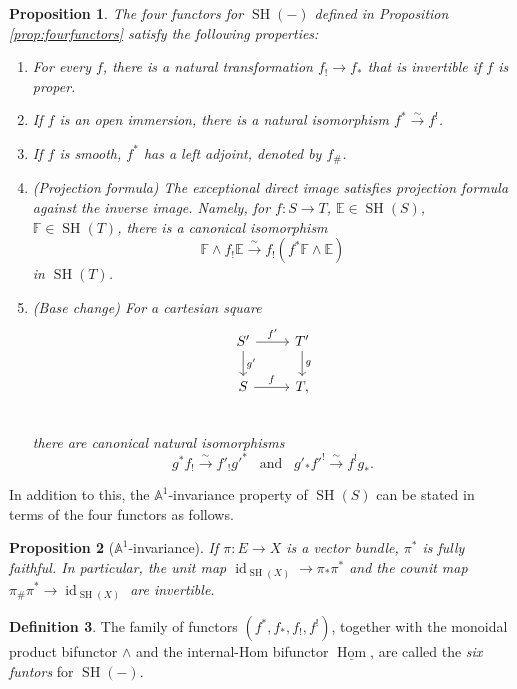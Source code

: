\documentclass[10pt]{amsart}
\theoremstyle{definition}
\newtheorem{defn}{Definition}[section]
\theoremstyle{plain}
\newtheorem{prop}[defn]{Proposition}
\numberwithin{equation}{section}
\newcommand{\0}{\emptyset}
\newcommand{\A}{{\mathbb A}}
\newcommand{\E}{{\mathbb E}}
\newcommand{\F}{{\mathbb F}}
\newcommand{\SH}{{\operatorname{SH}}}
\newcommand{\Hom}{{\operatorname{Hom}}}
\newcommand{\id}{{\operatorname{id}}}
\begin{document}
\begin{prop}
\label{prop:sixfunctors}
    The four functors for $\SH(-)$ defined in Proposition \ref{prop:fourfunctors} satisfy the following properties:
    \begin{enumerate}
        \item For every $f$, there is a natural transformation $f_! \to f_*$ that is invertible if $f$ is proper.
        \item If $f$ is an open immersion, there is a natural isomorphism $f^* \xrightarrow{\sim} f^!$.
        \item If $f$ is smooth, $f^*$ has a left adjoint, denoted by $f_{\#}$.
        \item (Projection formula) The exceptional direct image satisfies projection formula against the inverse image. Namely, for $f:S \to T$, $\E \in \SH(S)$, $\F \in \SH(T)$, there is a canonical isomorphism
        $$\F \wedge f_! \E \xrightarrow{\sim} f_!(f^* \F \wedge \E)$$
        in $\SH(T)$.
        \item (Base change) For a cartesian square
        $$\begin{tikzcd}
         S' \arrow[d, "g'"] \arrow[r, "f'"] & T' \arrow[d, "g"] \\
         S \arrow[r, "f"] & T, \\
        \end{tikzcd}$$
        there are canonical natural isomorphisms
        $$g^* f_! \xrightarrow{\sim} f'_!g'^* \; \; \; \text{and} \; \; \; g'_*f'^! \xrightarrow{\sim}f^!g_*.$$
    \end{enumerate}
\end{prop}

In addition to this, the $\A^1$-invariance property of $\SH(S)$ can be stated in terms of the four functors as follows.

\begin{prop}[$\A^1$-invariance]
\label{prop:hom-invariance}
    If $\pi:E \to X$ is a vector bundle, $\pi^*$ is fully faithful. In particular, the unit map $\id_{\SH(X)} \to \pi_*\pi^*$ and the counit map $\pi_\# \pi^* \to \id_{\SH(X)}$ are invertible.
\end{prop}

\begin{defn}
    The family of functors $(f^*,f_*,f_!,f^!)$, together with the monoidal product bifunctor $\wedge$ and the internal-Hom bifunctor $\underline{\Hom}$, are called the \emph{six funtors} for $\SH(-)$.
\end{defn}
\end{document}
